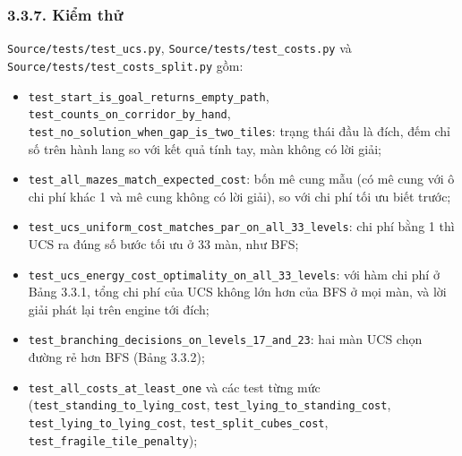 \subsubsection{3.3.7. Kiểm thử}

\texttt{Source/\allowbreak{}tests/\allowbreak{}test\_\allowbreak{}ucs.\allowbreak{}py}, \texttt{Source/\allowbreak{}tests/\allowbreak{}test\_\allowbreak{}costs.\allowbreak{}py} và \texttt{Source/\allowbreak{}tests/\allowbreak{}test\_\allowbreak{}costs\_\allowbreak{}split.\allowbreak{}py} gồm:

\begin{itemize}
\tightlist
\item
  \texttt{test\_\allowbreak{}start\_\allowbreak{}is\_\allowbreak{}goal\_\allowbreak{}returns\_\allowbreak{}empty\_\allowbreak{}path}, \texttt{test\_\allowbreak{}counts\_\allowbreak{}on\_\allowbreak{}corridor\_\allowbreak{}by\_\allowbreak{}hand}, \texttt{test\_\allowbreak{}no\_\allowbreak{}solution\_\allowbreak{}when\_\allowbreak{}gap\_\allowbreak{}is\_\allowbreak{}two\_\allowbreak{}tiles}: trạng thái đầu là đích, đếm chỉ số trên hành lang so với kết quả tính tay, màn không có lời giải;
\item
  \texttt{test\_\allowbreak{}all\_\allowbreak{}mazes\_\allowbreak{}match\_\allowbreak{}expected\_\allowbreak{}cost}: bốn mê cung mẫu (có mê cung với ô chi phí khác 1 và mê cung không có lời giải), so với chi phí tối ưu biết trước;
\item
  \texttt{test\_\allowbreak{}ucs\_\allowbreak{}uniform\_\allowbreak{}cost\_\allowbreak{}matches\_\allowbreak{}par\_\allowbreak{}on\_\allowbreak{}all\_\allowbreak{}33\_\allowbreak{}levels}: chi phí bằng 1 thì UCS ra đúng số bước tối ưu ở 33 màn, như BFS;
\item
  \texttt{test\_\allowbreak{}ucs\_\allowbreak{}energy\_\allowbreak{}cost\_\allowbreak{}optimality\_\allowbreak{}on\_\allowbreak{}all\_\allowbreak{}33\_\allowbreak{}levels}: với hàm chi phí ở Bảng 3.3.1, tổng chi phí của UCS không lớn hơn của BFS ở mọi màn, và lời giải phát lại trên engine tới đích;
\item
  \texttt{test\_\allowbreak{}branching\_\allowbreak{}decisions\_\allowbreak{}on\_\allowbreak{}levels\_\allowbreak{}17\_\allowbreak{}and\_\allowbreak{}23}: hai màn UCS chọn đường rẻ hơn BFS (Bảng 3.3.2);
\item
  \texttt{test\_\allowbreak{}all\_\allowbreak{}costs\_\allowbreak{}at\_\allowbreak{}least\_\allowbreak{}one} và các test từng mức (\texttt{test\_\allowbreak{}standing\_\allowbreak{}to\_\allowbreak{}lying\_\allowbreak{}cost}, \texttt{test\_\allowbreak{}lying\_\allowbreak{}to\_\allowbreak{}standing\_\allowbreak{}cost}, \texttt{test\_\allowbreak{}lying\_\allowbreak{}to\_\allowbreak{}lying\_\allowbreak{}cost}, \texttt{test\_\allowbreak{}split\_\allowbreak{}cubes\_\allowbreak{}cost}, \texttt{test\_\allowbreak{}fragile\_\allowbreak{}tile\_\allowbreak{}penalty});

\end{itemize}
